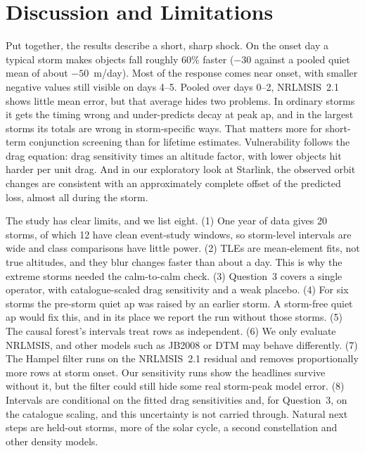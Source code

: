 \section{Discussion and Limitations}
\label{sec:discussion}

Put together, the results describe a short, sharp shock. On the onset day a typical storm makes
objects fall roughly 60\% faster ($-30$ against a pooled quiet mean of about $-50$~m/day). Most of
the response comes near onset, with smaller negative values still visible on days 4--5. Pooled
over days 0--2, NRLMSIS~2.1 shows little mean error, but that average hides two problems. In
ordinary storms it gets the timing wrong and under-predicts decay at peak ap, and in the largest
storms its totals are wrong in storm-specific ways. That matters more for short-term conjunction
screening than for lifetime estimates. Vulnerability follows the drag equation: drag sensitivity
times an altitude factor, with lower objects hit harder per unit drag. And in our exploratory
look at Starlink, the observed orbit changes are consistent with an approximately complete
offset of the predicted loss, almost all during the storm.

The study has clear limits, and we list eight. (1) One year of data gives 20 storms, of which 12
have clean event-study windows, so storm-level intervals are wide and class comparisons have
little power. (2) TLEs are mean-element fits, not true altitudes, and they blur changes faster
than about a day. This is why the extreme storms needed the calm-to-calm check. (3) Question~3
covers a single operator, with catalogue-scaled drag sensitivity and a weak placebo. (4) For six
storms the pre-storm quiet ap was raised by an earlier storm. A storm-free quiet ap would fix
this, and in its place we report the run without those storms. (5) The causal forest's intervals
treat rows as independent. (6) We only evaluate NRLMSIS, and other models such as JB2008 or DTM
may behave differently. (7) The Hampel filter runs on the NRLMSIS~2.1 residual and removes
proportionally more rows at storm onset. Our sensitivity runs show the headlines survive without
it, but the filter could still hide some real storm-peak model error. (8) Intervals are
conditional on the fitted drag sensitivities and, for Question~3, on the catalogue scaling, and
this uncertainty is not carried through. Natural next steps are held-out storms, more of the solar cycle, a
second constellation and other density models.
